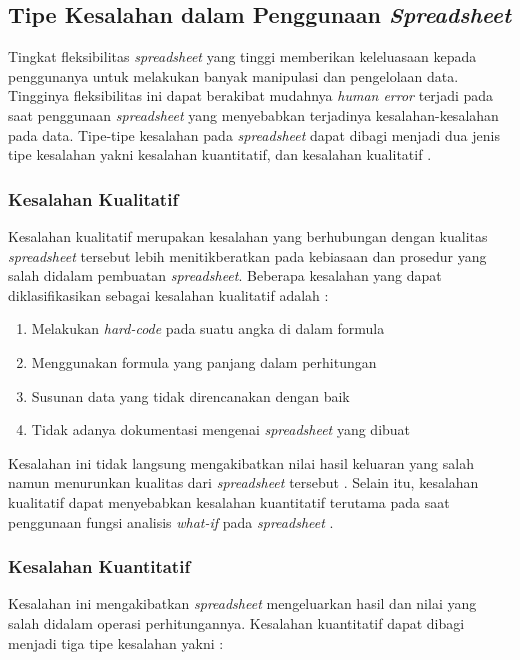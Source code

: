 \subsection{Tipe Kesalahan dalam Penggunaan \textit{Spreadsheet}}
Tingkat fleksibilitas \textit{spreadsheet} yang tinggi memberikan keleluasaan kepada penggunanya untuk melakukan banyak manipulasi dan pengelolaan data. Tingginya fleksibilitas ini dapat berakibat mudahnya \textit{human error} terjadi pada saat penggunaan \textit{spreadsheet} yang menyebabkan terjadinya kesalahan-kesalahan pada data. Tipe-tipe kesalahan pada \textit{spreadsheet} dapat dibagi menjadi dua jenis tipe kesalahan yakni kesalahan kuantitatif, dan kesalahan kualitatif \parencite{Panko1998}. 

    \subsubsection{Kesalahan Kualitatif}
    Kesalahan kualitatif merupakan kesalahan yang berhubungan dengan kualitas \textit{spreadsheet} tersebut lebih menitikberatkan pada kebiasaan dan prosedur yang salah didalam pembuatan \textit{spreadsheet}. Beberapa kesalahan yang dapat diklasifikasikan sebagai kesalahan kualitatif adalah \parencite{Powell2009}:

    \begin{enumerate}
        \item Melakukan \textit{hard-code} pada suatu angka di dalam formula
        \item Menggunakan formula yang panjang dalam perhitungan
        \item Susunan data yang tidak direncanakan dengan baik
        \item Tidak adanya dokumentasi mengenai \textit{spreadsheet} yang dibuat
    \end{enumerate}

    Kesalahan ini tidak langsung mengakibatkan nilai hasil keluaran yang salah namun menurunkan kualitas dari \textit{spreadsheet} tersebut \parencite{Rajalingham2001}. Selain itu, kesalahan kualitatif dapat menyebabkan kesalahan kuantitatif terutama pada saat penggunaan fungsi analisis \textit{what-if} pada \textit{spreadsheet} \parencite{Panko1998}.

    \subsubsection{Kesalahan Kuantitatif}
    Kesalahan ini mengakibatkan \textit{spreadsheet} mengeluarkan hasil dan nilai yang salah didalam operasi perhitungannya. Kesalahan kuantitatif dapat dibagi menjadi tiga tipe kesalahan yakni \parencite{Panko1998}:

